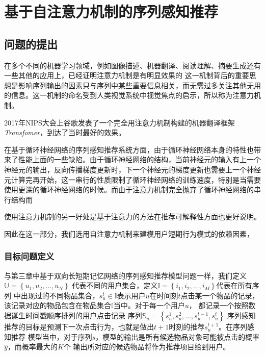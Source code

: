 ﻿%
\chapter{基于自注意力机制的序列感知推荐}

\section{问题的提出}
在多个不同的机器学习领域，例如图像描述、机器翻译、阅读理解、摘要生成还有一些其他的应用上，已经证明注意力机制是有明显效果的%
这一机制背后的重要思想是影响序列输出的因素只与序列中某些重要信息相关，而无需过多关注其他无用的信息。这一机制的命名受到人类视觉系统中视觉焦点的启示，所以称为注意力机制。

2017年NIPS大会上谷歌发表了一个完全用注意力机制构建的机器翻译框架\textit{Transfomer}，到达了当时最好的效果。


在基于循环神经网络的序列感知推荐系统方面，由于循环神经网络本身的特性也带来了性能上面的一些缺陷。由于循环神经网络的结构，当前神经元的输入有上一个神经元的输出，反向传播梯度更新时，下一个神经元的梯度更新也需要上一个神经元计算完再开始，这一串行的性质限制了循环神经网络的训练速度，特别是当需要使用更深的循环神经网络的时候。而由于注意力机制完全抛弃了循环神经网络的串行结构而

使用注意力机制的另一好处是基于注意力的方法在推荐可解释性方面也更好说明。%

因此在这一部分，我们选用自注意力机制来建模用户短期行为模式的依赖因素，

\subsection{目标问题定义}

与第三章中基于双向长短期记忆网络的序列感知推荐模型问题一样，我们定义$\mathbb{U}= \left \{ u_{1},u_{2},...,u_{N} \right \}\label{eq}$%
代表不同的用户集合，定义$\mathbb{I}= \left \{ i_{1},i_{2},...,i_{M} \right \}$代表在所有序列%
中出现过的不同物品集合，$s_{u}^{t}\in \mathbb{I}$表示用户$u$在时间刻$t$点击某一个物品的记录，%
该记录对应的物品包含在物品集合$\mathbb{I}$当中。对于每一个用户$u$，%
都记录一个按照数据诞生时间戳顺序排列的用户点击记录%
序列$\mathbb{S}_{u}=\left \{ s_{u}^{1},s_{u}^{2},...,s_{u}^{t-1},s_{u}^{t} \right \}$%
序列感知推荐的目标是预测下一次点击行为，也就是做出$t+1$时刻的推荐$s_{u}^{t+1}$。在序列感知推荐%
模型当中，对于序列$s$，模型的输出是所有候选物品对象可能被点击的概率$\hat{y}$，而概率最大的$K$个%
输出所对应的候选物品将作为推荐项目给到用户。%


